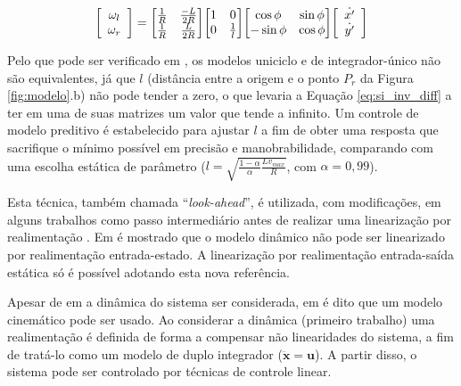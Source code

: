 \begin{equation}
	\label{eq:si_inv_diff}
	\mleft[ 
	\begin{array}{c c}
	\omega_l \\ \omega_r
	\end{array}
	\mright] = \mleft[
	\begin{matrix}
		  \frac{1}{R} & \frac{-L}{2R} \\
		  \frac{1}{R} & \frac{L}{2R} \\
	\end{matrix}
	\mright] \mleft[
	\begin{matrix}
		  1 & 0 \\
		  0 & \frac{1}{l} \\
	\end{matrix}
	\mright] \mleft[
	\begin{matrix}
		  \cos{\phi} & \sin{\phi} \\
		  -\sin{\phi} & \cos{\phi} \\
	\end{matrix}
	\mright] \mleft[ 
	\begin{array}{c c}
	\dot{x'} \\ \dot{y'}
	\end{array}
	\mright]
\end{equation}

Pelo que pode ser verificado em , os modelos
uniciclo e de integrador-único não são equivalentes, já que $l$ (distância 
entre a origem e o ponto $P_r$ da Figura \ref{fig:modelo}.b) não pode tender
a zero, o que levaria a Equação \ref{eq:si_inv_diff} a ter em uma de suas matrizes 
um valor que tende a infinito. Um controle de modelo preditivo é estabelecido para 
ajustar $l$ a fim de obter uma resposta que sacrifique o mínimo possível em 
precisão e manobrabilidade, comparando com uma escolha estática de parâmetro 
($l = \sqrt{\frac{1-\alpha}{\alpha}\frac{Lv_{max}}{R}}$, 
com $\alpha = 0,99$). 

Esta técnica, também chamada ``\textit{look-ahead}'', é utilizada, com
modificações, em alguns trabalhos como passo intermediário antes de realizar uma
linearização por realimentação \cite{art:feedlin_lookahead, art:novel}. Em
 é mostrado que o modelo dinâmico não pode ser
linearizado por realimentação entrada-estado. A linearização por realimentação
entrada-saída estática só é possível adotando esta nova referência.

Apesar de em  a dinâmica do sistema ser
considerada, em  é dito que um modelo cinemático pode ser
usado. Ao considerar a dinâmica (primeiro trabalho) uma realimentação é
definida de forma a compensar não linearidades do sistema, a fim de tratá-lo
como um modelo de duplo integrador ($\mathbf{\ddot{x}} = \mathbf{u}$). A partir
disso, o sistema pode ser controlado por técnicas de controle linear. 

